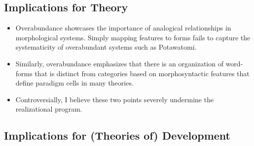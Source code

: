 \subsection{Implications for Theory}

\begin{itemize}
\item Overabundance showcases the importance of analogical
  relationships in morphological systems. Simply mapping features to
  forms fails to capture the systematicity of overabundant systems
  such as Potawatomi.
\item Similarly, overabundance emphasizes that there is an
  organization of word-forms that is distinct from categories based on
  morphosyntactic features that define paradigm cells in many
  theories.
\item Controversially, I believe these two points severely undermine
  the realizational program.
\end{itemize}

\subsection{Implications for (Theories of) Development}

